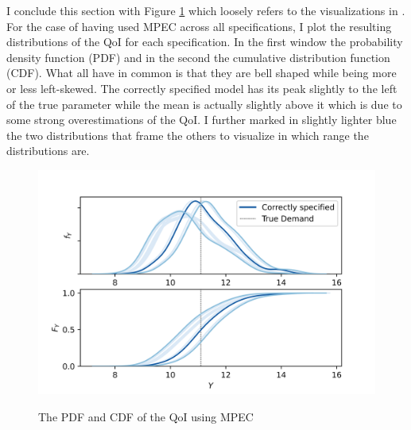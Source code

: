I conclude this section with Figure \ref{figure11} which loosely refers to the visualizations in \cite{Oberkampf.2010}. For the case of having used MPEC across all specifications, I plot the resulting distributions of the QoI for each specification. In the first window the probability density function (PDF) and in the second the cumulative distribution function (CDF). What all have in common is that they are bell shaped while being more or less left-skewed. The correctly specified model has its peak slightly to the left of the true parameter while the mean is actually slightly above it which is due to some strong overestimations of the QoI. I further marked in slightly lighter blue the two distributions that frame the others to visualize in which range the distributions are.
\begin{figure}[!t]
	\caption{The PDF and CDF of the QoI using MPEC}
	\vspace*{-4mm}
	\centering
	\includegraphics[scale=0.9]{../figures/figure_11.png}
	\label{figure11}
\end{figure}
